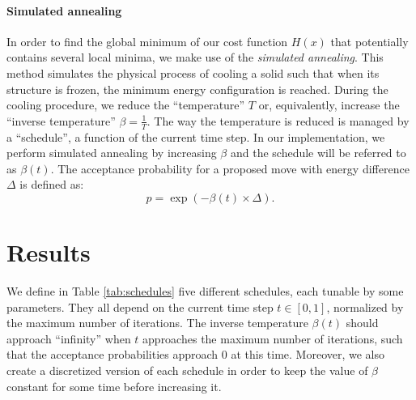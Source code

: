 \documentclass{article}
\begin{document}
  \paragraph{Simulated annealing}
  In order to find the global minimum of our cost function $H(x)$ that potentially contains several local minima, we make use of the \textit{simulated annealing}. This method simulates the physical process of cooling a solid such that when its structure is frozen, the minimum energy configuration is reached. During the cooling procedure, we reduce the ``temperature'' $T$ or, equivalently, increase the ``inverse temperature'' $\beta=\frac{1}{T}$. The way the temperature is reduced is managed by a ``schedule'', a function of the current time step. In our implementation, we perform simulated annealing by increasing $\beta$ and the schedule will be referred to as $\beta(t)$. The acceptance probability for a proposed move with energy difference $\Delta$ is defined as:
  \[
    p = \exp(- \beta(t) \times \Delta).
  \]

  \section*{Results}

  We define in Table \ref{tab:schedules} five different schedules, each tunable by some parameters. They all depend on the current time step $t \in [0, 1]$, normalized by the maximum number of iterations. The inverse temperature $\beta(t)$ should approach ``infinity'' when $t$ approaches the maximum number of iterations, such that the acceptance probabilities approach $0$ at this time. Moreover, we also create a discretized version of each schedule in order to keep the value of $\beta$ constant for some time before increasing it.
   
\end{document}
